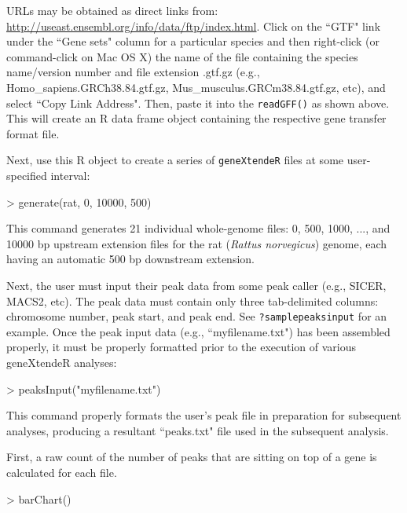 \documentclass[12pt]{article}
\begin{document}
URLs may be obtained as direct links from: \url{http://useast.ensembl.org/info/data/ftp/index.html}.  Click on the ``GTF" link under the ``Gene sets" column for a particular species and then right-click (or command-click on Mac OS X) the name of the file containing the species name/version number and file extension .gtf.gz (e.g., Homo\_sapiens.GRCh38.84.gtf.gz, Mus\_musculus.GRCm38.84.gtf.gz, etc), and select ``Copy Link Address".  Then, paste it into the \texttt{readGFF()} as shown above.  This will create an R data frame object containing the respective gene transfer format file.

Next, use this R object to create a series of \texttt{geneXtendeR} files at some user-specified interval:

\begin{Schunk}
\begin{Sinput}
> generate(rat, 0, 10000, 500)
\end{Sinput}
\end{Schunk}


This command generates 21 individual whole-genome files: 0, 500, 1000, ..., and 10000 bp upstream extension files for the rat (\emph{Rattus norvegicus}) genome, each having an automatic 500 bp downstream extension.

Next, the user must input their peak data from some peak caller (e.g., SICER, MACS2, etc).  The peak data must contain only three tab-delimited columns: chromosome number, peak start, and peak end.  See \texttt{?samplepeaksinput} for an example.  Once the peak input data (e.g., ``myfilename.txt") has been assembled properly, it must be properly formatted prior to the execution of various geneXtendeR analyses:

\begin{Schunk}
\begin{Sinput}
> peaksInput("myfilename.txt")
\end{Sinput}
\end{Schunk}

This command properly formats the user's peak file in preparation for subsequent analyses, producing a resultant ``peaks.txt" file used in the subsequent analysis.

First, a raw count of the number of peaks that are sitting on top of a gene is calculated for each file.

\begin{Schunk}
\begin{Sinput}
> barChart()
\end{Sinput}
\end{Schunk}
\end{document}
